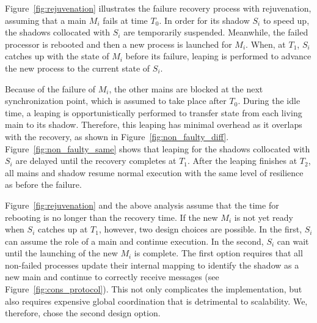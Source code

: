 

Figure~\ref{fig:rejuvenation} illustrates the failure recovery process with rejuvenation, assuming that a main $M_i$ fails at time $T_0$.
In order for its shadow $S_i$ to speed up, the shadows collocated with $S_i$ are temporarily suspended. %
Meanwhile, the failed processor is rebooted and then a new process is launched for $M_i$. When, at $T_1$, $S_i$ catches up with the state of $M_i$ before its failure, leaping is performed to advance the new process to the current state of $S_i$. %

Because of the failure of $M_i$, the other mains are blocked at the next synchronization point, which is assumed to take place after $T_0$. During the idle time, a leaping is opportunistically performed to transfer state from each living main to its shadow. Therefore, this leaping has minimal overhead as it overlaps with the recovery, as shown in Figure~\ref{fig:non_faulty_diff}. Figure~\ref{fig:non_faulty_same} shows that leaping for the shadows collocated with $S_i$ are delayed until the recovery completes at $T_1$. After the leaping finishes at $T_2$, all mains and shadow resume normal execution with the same level of resilience as before the failure.

Figure~\ref{fig:rejuvenation} and the above analysis assume that the time for rebooting is no longer than the recovery time. If the new $M_i$ is not yet ready when $S_i$ catches up at $T_1$, however, two design choices are possible. In the first, $S_i$ can assume the role of a main and continue execution. In the second, $S_i$ can wait until the launching of the new $M_i$ is complete. The first option requires that all non-failed processes update their internal mapping to identify the shadow as a new main and continue to correctly receive messages (see Figure~\ref{fig:cons_protocol}). This not only complicates the implementation, but also requires expensive global coordination that is detrimental to scalability. We, therefore, chose the second design option.



